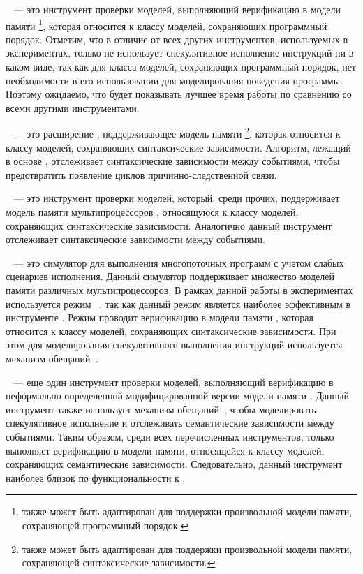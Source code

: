 \textbf{\genmc}~\cite{Kokologiannakis:PLDI2019,Kokologiannakis:CAD2021} ---
это инструмент проверки моделей, выполняющий верификацию в модели памяти \RCMM%
\footnote{\genmc также может быть адаптирован для поддержки 
  произвольной модели памяти, сохраняющей программный порядок.}, 
которая относится к классу моделей, сохраняющих программный порядок.  
Отметим, что в отличие от всех других инструментов, используемых в экспериментах, 
только \genmc не использует спекулятивное исполнение инструкций 
ни в каком виде, так как для класса моделей, сохраняющих программный порядок,
нет необходимости в его использовании для моделирования поведения программы. 
Поэтому ожидаемо, что \genmc будет показывать 
лучшее время работы по сравнению со всеми другими инструментами. 

\textbf{\hmc}~\cite{Kokologiannakis-Vafeiadis:ASPLOS2020} --- 
это расширение \genmc, поддерживающее модель памяти \IMM
\footnote{\hmc также может быть адаптирован для поддержки 
  произвольной модели памяти, сохраняющей синтаксические зависимости.},
которая относится к классу моделей, сохраняющих синтаксические зависимости.  
Алгоритм, лежащий в основе \hmc, отслеживает синтаксические зависимости между событиями, 
чтобы предотвратить появление циклов причинно-следственной связи. 

\textbf{\Nidhugg}~\cite{Abdulla-al:TACAS2015,Abdulla-al:CAV2016} --- 
это инструмент проверки моделей, который, среди прочих, 
поддерживает модель памяти мультипроцессоров \POWER, 
относящуюся к классу моделей, сохраняющих синтаксические зависимости.  
Аналогично \hmc данный инструмент отслеживает синтаксические зависимости между событиями.

\textbf{\rmem}~\cite{RMEM} --- 
это симулятор для выполнения многопоточных программ с учетом слабых сценариев исполнения. 
Данный симулятор поддерживает множество моделей памяти различных мультипроцессоров. 
В рамках данной работы в экспериментах используется режим \PrmARM%
~\cite{Pulte-al:PLDI2019}, так как данный режим является 
наиболее эффективным в инструменте \rmem.
Режим \PrmARM проводит верификацию в модели памяти , 
которая относится к классу моделей, сохраняющих синтаксические зависимости. 
При этом для моделирования спекулятивного выполнения инструкций 
используется механизм обещаний~\cite{Kang-al:POPL17}.  

\textbf{\CDSChecker}~\cite{Norris-Demsky:OOPSLA2013} --- 
еще один инструмент проверки моделей, выполняющий верификацию 
в неформально определенной модифицированной версии модели памяти \CMM.
Данный инструмент также использует механизм обещаний~\cite{Kang-al:POPL17}, 
чтобы моделировать спекулятивное исполнение и отслеживать
семантические зависимости между событиями. 
Таким образом, среди всех перечисленных инструментов,
только \CDSChecker выполняет верификацию в модели памяти, 
относящейся к классу моделей, сохраняющих семантические зависимости. 
Следовательно, данный инструмент наиболее близок по функциональности к \wmc.

